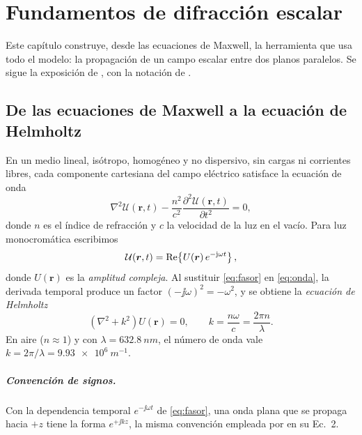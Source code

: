 \chapter{Fundamentos de difracción escalar}\label{cap:difraccion}

Este capítulo construye, desde las ecuaciones de Maxwell, la herramienta que usa todo el
modelo: la propagación de un campo escalar entre dos planos paralelos. Se sigue la
exposición de \textcite[caps.~3--4]{goodman2005}, con la notación de \textcite{chen2021}.

\section{De las ecuaciones de Maxwell a la ecuación de Helmholtz}\label{sec:helmholtz}

En un medio lineal, isótropo, homogéneo y no dispersivo, sin cargas ni corrientes libres,
cada componente cartesiana del campo eléctrico satisface la ecuación de onda
\parencite[sec.~3.2]{goodman2005}
\begin{equation}
  \nabla^2 \mathcal{U}(\bm r,t)-\frac{n^2}{c^2}\frac{\partial^2 \mathcal{U}(\bm r,t)}{\partial t^2}=0,
  \label{eq:onda}
\end{equation}
donde $n$ es el índice de refracción y $c$ la velocidad de la luz en el vacío. Para luz
monocromática escribimos
\begin{equation}
  \mathcal{U}(\bm r,t)=\operatorname{Re}\!\left\{U(\bm r)\,e^{-\mathrm{j}\omega t}\right\},
  \label{eq:fasor}
\end{equation}
donde $U(\bm r)$ es la \emph{amplitud compleja}. Al sustituir \eqref{eq:fasor} en
\eqref{eq:onda}, la derivada temporal produce un factor $(-\jj\omega)^2=-\omega^2$, y se obtiene
la \emph{ecuación de Helmholtz}
\begin{equation}
  \left(\nabla^2+k^2\right)U(\bm r)=0,\qquad k=\frac{n\omega}{c}=\frac{2\pi n}{\lambda}.
  \label{eq:helmholtz}
\end{equation}
En aire ($n\approx1$) y con $\lambda=\SI{632.8}{nm}$, el número de onda vale
$k=2\pi/\lambda=\SI{9.93e6}{m^{-1}}$.

\paragraph{Convención de signos.} Con la dependencia temporal $e^{-\jj\omega t}$ de
\eqref{eq:fasor}, una onda plana que se propaga hacia $+z$ tiene la forma $e^{+\jj kz}$, la
misma convención empleada por \textcite{chen2021} en su Ec.~2.

